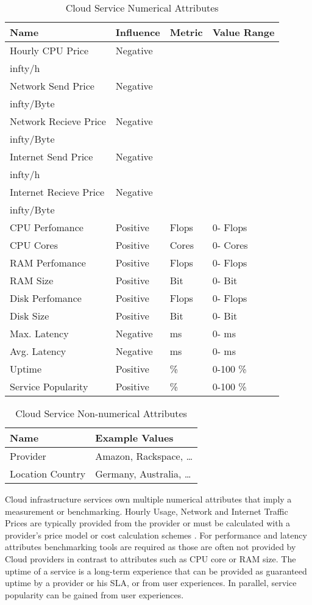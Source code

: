 \documentclass[10pt]{article}
\begin{document}
\begin{table}[!h]
\centering
\caption{Cloud Service Numerical Attributes}\label{service-numerical-attributes}
\begin{tabular}{|l|l|l|l|} \hline
Name&Influence&Metric&Value Range\\ \hline
Hourly CPU Price&Negative&\\infty/h\\
Network Send Price&Negative&\\infty/Byte\\
Network Recieve Price&Negative&\\infty/Byte\\
Internet Send Price&Negative&\\infty/h\\
Internet Recieve Price&Negative&\\infty/Byte\\
CPU Perfomance&Positive&Flops&0- Flops\\
CPU Cores&Positive&Cores&0- Cores\\
RAM Perfomance&Positive&Flops&0- Flops\\
RAM Size&Positive&Bit&0- Bit\\
Disk Perfomance&Positive&Flops&0- Flops\\
Disk Size&Positive&Bit&0- Bit\\
Max. Latency&Negative&ms&0- ms\\
Avg. Latency&Negative&ms&0- ms\\
Uptime&Positive&\%&0-100 \%\\
Service Popularity&Positive&\%&0-100 \%\\
\hline\end{tabular}
\end{table}

\begin{table}[!h]
\centering
\caption{Cloud Service Non-numerical Attributes}\label{service-nonnumerical-attributes}
\begin{tabular}{|l|l|} \hline
Name&Example Values\\ \hline
Provider&Amazon, Rackspace, \ldots\\
Location Country&Germany, Australia, \ldots\\
\hline\end{tabular}
\end{table}

Cloud infrastructure services own multiple numerical attributes that imply a measurement or benchmarking. Hourly Usage, Network and Internet Traffic Prices are typically provided from the provider or must be calculated with a provider's price model or cost calculation schemes \cite{klems2009clouds}\cite{khajeh2011decision}. For performance and latency attributes benchmarking tools are required as those are often not provided by Cloud providers \cite{lenk2011you} in contrast to attributes such as CPU core or RAM size. The uptime of a service is a long-term experience that can be provided as guaranteed uptime by a provider or his SLA, or from user experiences. In parallel, service popularity can be gained from user experiences.
\end{document}
